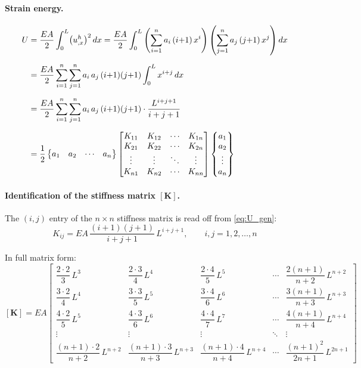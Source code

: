 \documentclass[11pt, a4paper]{article}
\begin{document}
\paragraph{Strain energy.}
\begin{align}
U &= \frac{EA}{2}\int_0^L \bigl(u^h_{,x}\bigr)^2\,dx
   = \frac{EA}{2}\int_0^L
     \left(\sum_{i=1}^n a_i\,(i{+}1)\,x^i\right)
     \left(\sum_{j=1}^n a_j\,(j{+}1)\,x^j\right) dx \notag\\[6pt]
  &= \frac{EA}{2}\sum_{i=1}^n\sum_{j=1}^n
     a_i\,a_j\,(i{+}1)(j{+}1)
     \int_0^L x^{i+j}\,dx \notag\\[6pt]
  &= \frac{EA}{2}\sum_{i=1}^n\sum_{j=1}^n
     a_i\,a_j\,(i{+}1)(j{+}1)
     \cdot\frac{L^{i+j+1}}{i+j+1} \notag\\[6pt]
  &= \frac{1}{2}
     \begin{Bmatrix}a_1 & a_2 & \cdots & a_n\end{Bmatrix}
     \begin{bmatrix}
     K_{11} & K_{12} & \cdots & K_{1n}\\
     K_{21} & K_{22} & \cdots & K_{2n}\\
     \vdots & \vdots & \ddots & \vdots\\
     K_{n1} & K_{n2} & \cdots & K_{nn}
     \end{bmatrix}
     \begin{Bmatrix}a_1 \\ a_2 \\ \vdots \\ a_n\end{Bmatrix}
     \label{eq:U_gen}
\end{align}

\paragraph{Identification of the stiffness matrix $[\mathbf{K}]$.}
The $(i,j)$ entry of the $n\times n$ stiffness matrix is read off from \cref{eq:U_gen}:
\begin{equation}\label{eq:Kab_gen}
\boxed{K_{ij}
  = EA\,\frac{(i+1)(j+1)}{i+j+1}\,L^{i+j+1},
  \qquad i,j=1,2,\dots,n}
\end{equation}

In full matrix form:
\begin{equation}\label{eq:Kmat_full}
[\mathbf{K}] = EA
\begin{bmatrix}
\dfrac{2\cdot 2}{3}\,L^3 & \dfrac{2\cdot 3}{4}\,L^4 & \dfrac{2\cdot 4}{5}\,L^5 & \cdots & \dfrac{2(n{+}1)}{n{+}2}\,L^{n+2}\\[10pt]
\dfrac{3\cdot 2}{4}\,L^4 & \dfrac{3\cdot 3}{5}\,L^5 & \dfrac{3\cdot 4}{6}\,L^6 & \cdots & \dfrac{3(n{+}1)}{n{+}3}\,L^{n+3}\\[10pt]
\dfrac{4\cdot 2}{5}\,L^5 & \dfrac{4\cdot 3}{6}\,L^6 & \dfrac{4\cdot 4}{7}\,L^7 & \cdots & \dfrac{4(n{+}1)}{n{+}4}\,L^{n+4}\\[10pt]
\vdots & \vdots & \vdots & \ddots & \vdots \\[6pt]
\dfrac{(n{+}1)\cdot 2}{n{+}2}\,L^{n+2} & \dfrac{(n{+}1)\cdot 3}{n{+}3}\,L^{n+3} & \dfrac{(n{+}1)\cdot 4}{n{+}4}\,L^{n+4} & \cdots & \dfrac{(n{+}1)^2}{2n{+}1}\,L^{2n+1}
\end{bmatrix}
\end{equation}
\end{document}
